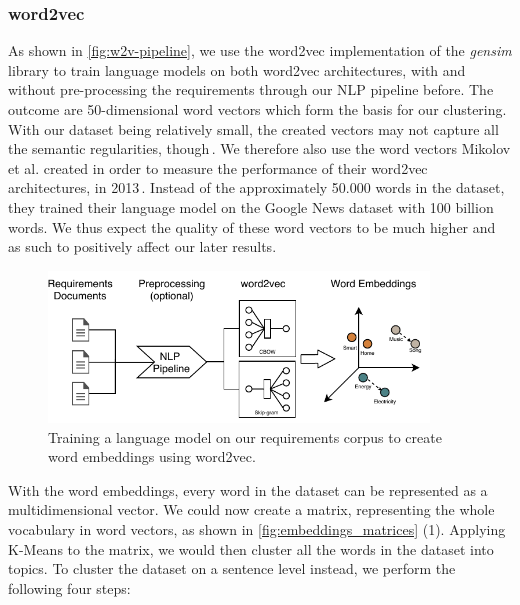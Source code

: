 \subsubsection{word2vec} %
\label{sub:own_word2vec}
As shown in \autoref{fig:w2v-pipeline}, we use the word2vec implementation of the \textit{gensim} library to train language models on both word2vec architectures, with and without pre-processing the requirements through our NLP pipeline before. The outcome are 50-dimensional word vectors which form the basis for our clustering. With our dataset being relatively small, the created vectors may not capture all the semantic regularities, though\,\cite{mikolov_distributed_2013}. We therefore also use the word vectors Mikolov et al. created in order to measure the performance of their word2vec architectures, in 2013\,\cite{mikolov_efficient_2013}. Instead of the approximately 50.000 words in the \crowdre{} dataset, they trained their language model on the Google News dataset with 100 billion words. We thus expect the quality of these word vectors to be much higher and as such to positively affect our later results.
\begin{figure}[ht]
  \begin{center}
    \includegraphics[width=0.9\textwidth]{figures/word2vec_pipeline.pdf}
    \caption{Training a language model on our requirements corpus to create word embeddings using word2vec.}
    \label{fig:w2v-pipeline}
  \end{center}
\end{figure}
\FloatBarrier

With the word embeddings, every word in the \crowdre{} dataset can be represented as a multidimensional vector. We could now create a matrix, representing the whole vocabulary in word vectors, as shown in \autoref{fig:embeddings_matrices} (1). Applying K-Means to the matrix, we would then cluster all the words in the dataset into topics. To cluster the dataset on a sentence level instead, we perform the following four steps:

